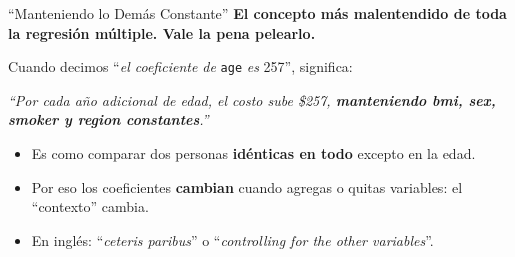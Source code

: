 \documentclass[aspectratio=169, 11pt]{beamer}
\begin{document}
\begin{frame}[shrink=8]{``Manteniendo lo Demás Constante''}
  \vspace{-4pt}
  {\footnotesize\color{arcaDark}\bfseries
    El concepto más malentendido de toda la regresión múltiple.
    Vale la pena pelearlo.}

  \vspace{6pt}
  {\footnotesize
  Cuando decimos ``\textit{el coeficiente de} \texttt{age} \textit{es} 257'',
  significa:}

  \vspace{4pt}
  \begin{center}
    \begin{tcolorbox}[colback=arcaGray, colframe=arcaRed, boxrule=0.8pt,
                      arc=3pt, width=0.85\textwidth]
    \centering
    \footnotesize
    \textit{``Por cada año adicional de edad, el costo sube \$257,
    \textbf{manteniendo bmi, sex, smoker y region constantes}.''}
    \end{tcolorbox}
  \end{center}

  \vspace{6pt}
  {\scriptsize
  \begin{itemize}\setlength{\itemsep}{5pt}
    \item[{\color{arcaRed}\faArrowRight}]
      Es como comparar dos personas \textbf{idénticas en todo}
      excepto en la edad.
    \item[{\color{arcaRed}\faArrowRight}]
      Por eso los coeficientes \textbf{cambian} cuando agregas o
      quitas variables: el ``contexto'' cambia.
    \item[{\color{arcaRed}\faArrowRight}]
      En inglés: ``\textit{ceteris paribus}'' o
      ``\textit{controlling for the other variables}''.
  \end{itemize}
  }
\end{frame}
\end{document}
